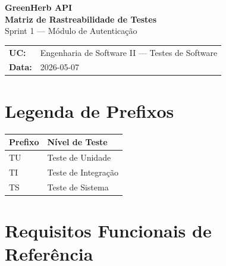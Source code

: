 \documentclass[a4paper,11pt]{article}
\begin{document}

\begin{center}
  {\LARGE\bfseries\color{titlecolor} GreenHerb API}\\[6pt]
  {\large\bfseries Matriz de Rastreabilidade de Testes}\\[4pt]
  {\normalsize Sprint 1 — Módulo de Autenticação}\\[10pt]
  \begin{tabular}{@{}ll@{}}
    \textbf{UC:}    & Engenharia de Software II — Testes de Software \\[2pt]
    \textbf{Data:}  & 2026-05-07 \\
  \end{tabular}
\end{center}

\vspace{0.5cm}
\tableofcontents
\newpage

\section{Legenda de Prefixos}

\begin{tabular}{@{}C{2cm}L{9cm}@{}}
  \toprule
  \textbf{Prefixo} & \textbf{Nível de Teste} \\
  \midrule
   TU & Teste de Unidade \\
  TI & Teste de Integração \\
   TS & Teste de Sistema \\
  \bottomrule
\end{tabular}

\section{Requisitos Funcionais de Referência}
\end{document}
